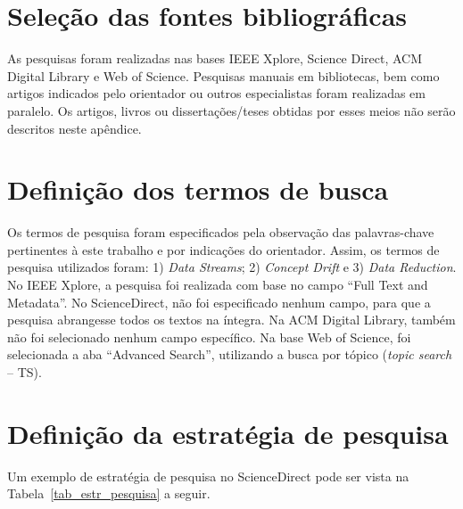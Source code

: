 \section{Seleção das fontes bibliográficas }\label{sec:prisma_fontes} 

As pesquisas foram realizadas nas bases IEEE Xplore, Science Direct, ACM Digital Library e Web of Science. Pesquisas manuais em bibliotecas, bem como artigos indicados pelo orientador ou outros especialistas foram realizadas em paralelo. Os artigos, livros ou dissertações/teses obtidas por esses meios não serão descritos neste apêndice.

\section{Definição dos termos de busca}\label{sec:prisma_termos} 

Os termos de pesquisa foram especificados pela observação das palavras-chave pertinentes à este trabalho e por indicações do orientador. Assim, os termos de pesquisa utilizados foram:  1) \textit{Data Streams}; 2) \textit{Concept Drift} e 3) \textit{Data Reduction}. No IEEE Xplore, a pesquisa foi realizada com base no campo ``Full Text and Metadata''. No ScienceDirect, não foi especificado nenhum campo, para que a pesquisa abrangesse todos os textos na íntegra. Na ACM Digital Library, também não foi selecionado nenhum campo específico. Na base Web of Science, foi selecionada a aba ``Advanced Search'', utilizando a busca por tópico (\textit{topic search} -- TS). 

\section{Definição da estratégia de pesquisa}\label{sec:prisma_estrategia} 

Um exemplo de estratégia de pesquisa no ScienceDirect pode ser vista na Tabela~\ref{tab_estr_pesquisa} a seguir.

